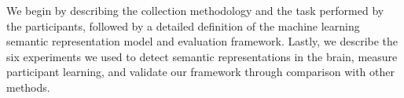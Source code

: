 \label{chapter:methodologies}

We begin by describing the collection methodology and the task performed by the participants, followed by a detailed definition of the machine learning semantic representation model and evaluation framework. Lastly, we describe the six experiments we used to detect semantic representations in the brain, measure participant learning, and validate our framework through comparison with other methods.




